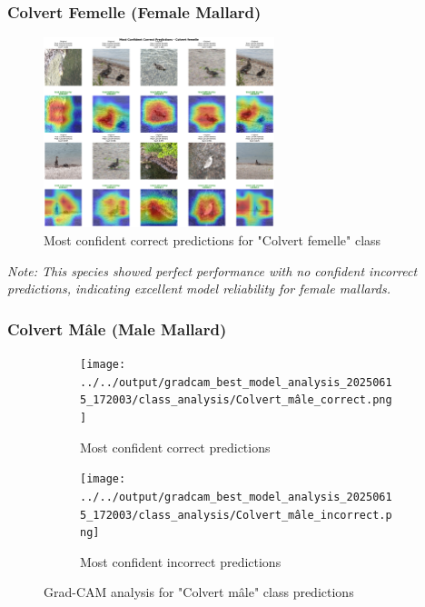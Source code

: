 \documentclass[12pt,a4paper]{article}
\begin{document}
\subsubsection{Colvert Femelle (Female Mallard)}

\begin{figure}[H]
    \centering
    \includegraphics[width=0.6\textwidth]{../../output/gradcam_best_model_analysis_20250615_172003/class_analysis/Colvert_femelle_correct.png}
    \caption{Most confident correct predictions for "Colvert femelle" class}
    \label{fig:femelle_correct}
\end{figure}

\textit{Note: This species showed perfect performance with no confident incorrect predictions, indicating excellent model reliability for female mallards.}

\subsubsection{Colvert Mâle (Male Mallard)}

\begin{figure}[H]
    \centering
    \begin{subfigure}[b]{0.45\textwidth}
        \centering
        \texttt{[image: ../../output/gradcam\_best\_model\_analysis\_20250615\_172003/class\_analysis/Colvert\_mâle\_correct.png]}
        \caption{Most confident correct predictions}
        \label{fig:male_correct}
    \end{subfigure}
    \hfill
    \begin{subfigure}[b]{0.45\textwidth}
        \centering
        \texttt{[image: ../../output/gradcam\_best\_model\_analysis\_20250615\_172003/class\_analysis/Colvert\_mâle\_incorrect.png]}
        \caption{Most confident incorrect predictions}
        \label{fig:male_incorrect}
    \end{subfigure}
    \caption{Grad-CAM analysis for "Colvert mâle" class predictions}
    \label{fig:male_gradcam}
\end{figure}
\end{document}
